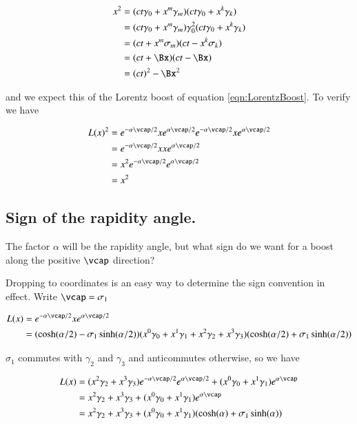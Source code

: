 \documentclass{article}
\begin{document}
\begin{align*}
x^2 
&= (ct \gamma_0 + x^m \gamma_m) (ct \gamma_0 + x^k \gamma_k) \\
&= (ct \gamma_0 + x^m \gamma_m) \gamma_0^2 (ct \gamma_0 + x^k \gamma_k) \\
&= (ct + x^m \sigma_m) (ct - x^k \sigma_k) \\
&= (ct + \Bx) (ct - \Bx) \\
&= (ct)^2 - \Bx^2
\end{align*}

and we expect this of the Lorentz boost of equation \ref{eqn:LorentzBoost}.  To verify we have

\begin{align*}
L(x)^2 
&=
e^{-\alpha \vcap/2}
x
e^{\alpha \vcap/2}
e^{-\alpha \vcap/2}
x
e^{\alpha \vcap/2} \\
&=
e^{-\alpha \vcap/2}
x
x
e^{\alpha \vcap/2} \\
&=
x^2
e^{-\alpha \vcap/2}
e^{\alpha \vcap/2} \\
&=
x^2
\end{align*}

\subsection{ Sign of the rapidity angle. }

The factor $\alpha$ will be the rapidity angle, but what sign do we want for a boost along the positive $\vcap$ direction?

Dropping to coordinates is an easy way to determine the sign convention in effect.  Write $\vcap = \sigma_1$

\begin{align*}
L(x) &= 
e^{-\alpha \vcap/2}
x
e^{\alpha \vcap/2} \\
&=
(\cosh(\alpha/2) - \sigma_1 \sinh(\alpha/2))
(
x^0 \gamma_0
+x^1 \gamma_1
+x^2 \gamma_2
+x^3 \gamma_3
)
(\cosh(\alpha/2) + \sigma_1 \sinh(\alpha/2))
\end{align*}

$\sigma_1$ commutes with $\gamma_2$ and $\gamma_3$ and anticommutes otherwise, so we have

\begin{align*}
L(x) &= 
(
x^2 \gamma_2
+x^3 \gamma_3
) 
e^{-\alpha \vcap/2}
e^{\alpha \vcap/2}
+
(
x^0 \gamma_0
+x^1 \gamma_1
)
e^{\alpha \vcap} \\
&=
x^2 \gamma_2
+x^3 \gamma_3
+(
x^0 \gamma_0
+x^1 \gamma_1
)
e^{\alpha \vcap} \\
&=
x^2 \gamma_2
+x^3 \gamma_3
+(
x^0 \gamma_0
+x^1 \gamma_1
)
(\cosh(\alpha) + \sigma_1 \sinh(\alpha))
\end{align*}
\end{document}
